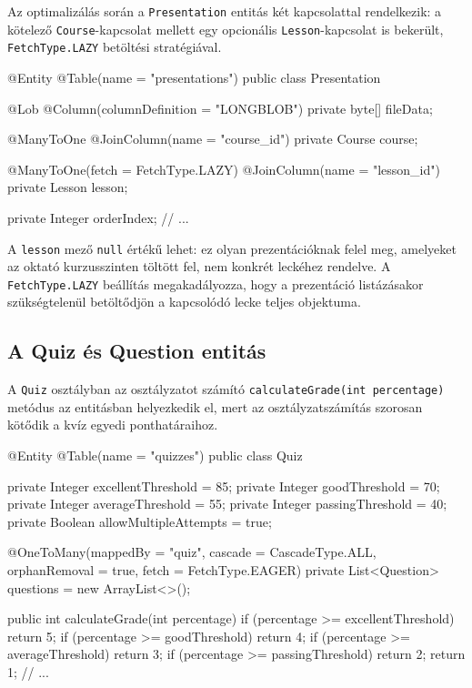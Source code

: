 Az optimalizálás során a \texttt{Presentation} entitás két kapcsolattal rendelkezik: a kötelező \texttt{Course}-kapcsolat mellett egy opcionális \texttt{Lesson}-kapcsolat is bekerült, \texttt{FetchType.LAZY} betöltési stratégiával.

\begin{java}[caption={A Presentation entitás bővített kapcsolatai},label=java:presentationentity]
@Entity
@Table(name = "presentations")
public class Presentation {

    @Lob
    @Column(columnDefinition = "LONGBLOB")
    private byte[] fileData;

    @ManyToOne
    @JoinColumn(name = "course_id")
    private Course course;

    @ManyToOne(fetch = FetchType.LAZY)
    @JoinColumn(name = "lesson_id")
    private Lesson lesson;

    private Integer orderIndex;
    // ...
}
\end{java}

A \texttt{lesson} mező \texttt{null} értékű lehet: ez olyan prezentációknak felel meg, amelyeket az oktató kurzusszinten töltött fel, nem konkrét leckéhez rendelve. A \texttt{FetchType.LAZY} beállítás megakadályozza, hogy a prezentáció listázásakor szükségtelenül betöltődjön a kapcsolódó lecke teljes objektuma.

\subsection{A Quiz és Question entitás}

A \texttt{Quiz} osztályban az osztályzatot számító \texttt{calculateGrade(int percentage)} metódus az entitásban helyezkedik el, mert az osztályzatszámítás szorosan kötődik a kvíz egyedi ponthatáraihoz.

\begin{java}[caption={A Quiz entitás pontszámítási metódusa},label=java:quizgrade]
@Entity
@Table(name = "quizzes")
public class Quiz {

    private Integer excellentThreshold = 85;
    private Integer goodThreshold      = 70;
    private Integer averageThreshold   = 55;
    private Integer passingThreshold   = 40;
    private Boolean allowMultipleAttempts = true;

    @OneToMany(mappedBy = "quiz",
               cascade = CascadeType.ALL,
               orphanRemoval = true,
               fetch = FetchType.EAGER)
    private List<Question> questions = new ArrayList<>();

    public int calculateGrade(int percentage) {
        if (percentage >= excellentThreshold) return 5;
        if (percentage >= goodThreshold)      return 4;
        if (percentage >= averageThreshold)   return 3;
        if (percentage >= passingThreshold)   return 2;
        return 1;
    }
    // ...
}
\end{java}

